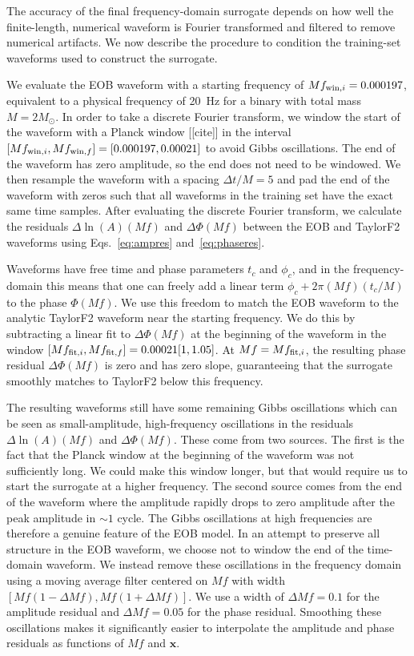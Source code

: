 \documentclass[prd,aps,letter,twocolumn,floatfix,notitlepage,nofootinbib]{revtex4-1}
\def\bx{\mathbf{x}}
\begin{document}
The accuracy of the final frequency-domain surrogate depends on how well the finite-length, numerical waveform is Fourier transformed and filtered to remove numerical artifacts. We now describe the procedure to condition the training-set waveforms used to construct the surrogate.

We evaluate the EOB waveform with a starting frequency of $Mf_{{\rm win}, i}=0.000197$, equivalent to a physical frequency of 20~Hz for a binary with total mass $M=2M_\odot$. In order to take a discrete Fourier transform, we window the start of the waveform with a Planck window [[cite]] in the interval $[Mf_{{\rm win}, i}, Mf_{{\rm win}, f}] = [0.000197, 0.00021]$ to avoid Gibbs oscillations. The end of the waveform has zero amplitude, so the end does not need to be windowed. We then resample the waveform with a spacing $\Delta t/M = 5$ and pad the end of the waveform with zeros such that all waveforms in the training set have the exact same time samples. After evaluating the discrete Fourier transform, we calculate the residuals $\Delta\ln(A)(Mf)$ and $\Delta\Phi(Mf)$ between the EOB and TaylorF2 waveforms using Eqs.~\eqref{eq:ampres} and~\eqref{eq:phaseres}. 

Waveforms have free time and phase parameters $t_c$ and $\phi_c$, and in the frequency-domain this means that one can freely add a linear term $\phi_c + 2\pi (Mf) (t_c/M)$ to the phase $\Phi(Mf)$. We use this freedom to match the EOB waveform to the analytic TaylorF2 waveform near the starting frequency. We do this by subtracting a linear fit to $\Delta\Phi(Mf)$ at the beginning of the waveform in the window $[Mf_{{\rm fit}, i}, Mf_{{\rm fit}, f}] = 0.00021[1, 1.05]$. At $Mf=Mf_{{\rm fit}, i}$, the resulting phase residual $\Delta\Phi(Mf)$ is zero and has zero slope, guaranteeing that the surrogate smoothly matches to TaylorF2 below this frequency.

The resulting waveforms still have some remaining Gibbs oscillations which can be seen as small-amplitude, high-frequency oscillations in the residuals $\Delta\ln(A)(Mf)$ and $\Delta\Phi(Mf)$. These come from two sources. The first is the fact that the Planck window at the beginning of the waveform was not sufficiently long. We could make this window longer, but that would require us to start the surrogate at a higher frequency. The second source comes from the end of the waveform where the amplitude rapidly drops to zero amplitude after the peak amplitude in $\sim 1$ cycle. The Gibbs oscillations at high frequencies are therefore a genuine feature of the EOB model. In an attempt to preserve all structure in the EOB waveform, we choose not to window the end of the time-domain waveform. We instead remove these oscillations in the frequency domain using a moving average filter centered on $Mf$ with width $[Mf(1-\Delta Mf), Mf(1+\Delta Mf)]$. We use a width of $\Delta Mf=0.1$ for the amplitude residual and $\Delta Mf=0.05$ for the phase residual. Smoothing these oscillations makes it significantly easier to interpolate the amplitude and phase residuals as functions of $Mf$ and $\bx$.
\end{document}
